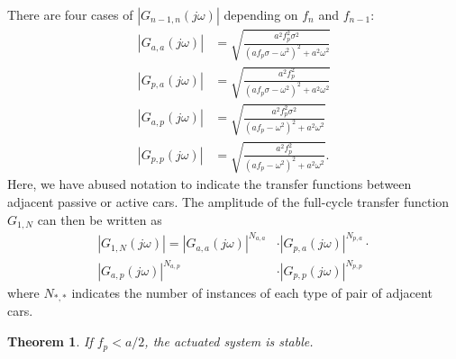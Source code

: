 \documentclass[10pt,twocolumn]{article}
\theoremstyle{ss}
\newtheorem{thm}{Theorem}[section]
\begin{document}
There are four cases of $|G_{n-1,n}(j\omega)|$ depending on $f_n$ and $f_{n-1}$:
\begin{align}
|G_{a,a}(j\omega)| &= \sqrt{\frac{a^2f_p^2\sigma^2}{(af_p\sigma - \omega^2)^2 + a^2\omega^2}}\\
|G_{p,a}(j\omega)| &= \sqrt{\frac{a^2f_p^2}{(af_p\sigma - \omega^2)^2 + a^2\omega^2}}\\
|G_{a,p}(j\omega)| &= \sqrt{\frac{a^2f_p^2\sigma^2}{(af_p - \omega^2)^2 + a^2\omega^2}}\\
|G_{p,p}(j\omega)| &= \sqrt{\frac{a^2f_p^2}{(af_p - \omega^2)^2 + a^2\omega^2}}.
\end{align}
Here, we have abused notation to indicate the transfer functions between adjacent passive or active cars.
The amplitude of the full-cycle transfer function $G_{1,N}$ can then be written as
\begin{align*}
|G_{1,N}(j\omega)| = |G_{a,a}(j\omega)|^{N_{a,a}} &\cdot |G_{p,a}(j\omega)|^{N_{p,a}} \cdot \\ |G_{a,p}(j\omega)|^{N_{a,p}} &\cdot |G_{p,p}(j\omega)|^{N_{p,p}}
\end{align*}
where $N_{*,*}$ indicates the number of instances of each type of pair of adjacent cars.
\begin{thm}
If $f_p < a/2$, the actuated system is stable.
\end{thm}
\end{document}
